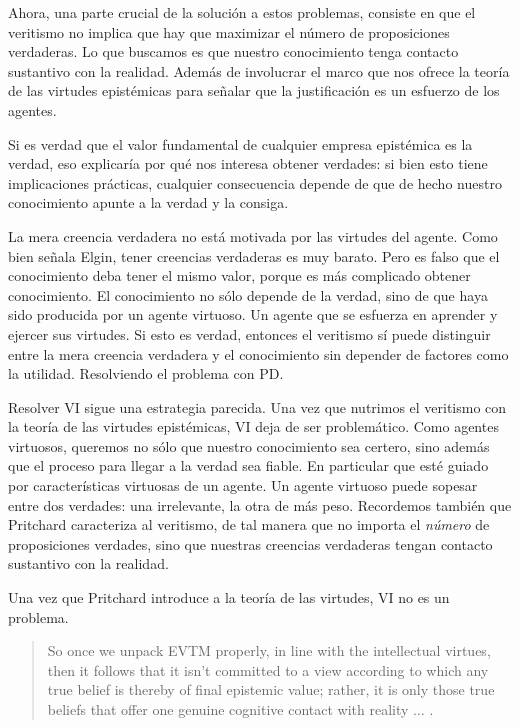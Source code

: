 Ahora, una parte crucial de la solución a estos problemas, consiste en que el veritismo no implica que hay que maximizar el número de proposiciones verdaderas.
Lo que buscamos es que nuestro conocimiento tenga contacto sustantivo con la realidad.
Además de involucrar el marco que nos ofrece la teoría de las virtudes epistémicas para señalar que la justificación es un esfuerzo de los agentes.

Si es verdad que el valor fundamental de cualquier empresa epistémica es la verdad, eso explicaría por qué nos interesa obtener verdades: si bien esto tiene implicaciones prácticas, cualquier consecuencia depende de que de hecho nuestro conocimiento apunte a la verdad y la consiga.

La mera creencia verdadera no está motivada por las virtudes del agente.
Como bien señala Elgin, tener creencias verdaderas es muy barato.
Pero es falso que el conocimiento deba tener el mismo valor, porque es más complicado obtener conocimiento.
El conocimiento no sólo depende de la verdad, sino de que haya sido producida por un agente virtuoso.
Un agente que se esfuerza en aprender y ejercer sus virtudes.
Si esto es verdad, entonces el veritismo sí puede distinguir entre la mera creencia verdadera y el conocimiento sin depender de factores como la utilidad.
Resolviendo el problema con PD.

Resolver VI sigue una estrategia parecida. 
Una vez que nutrimos el veritismo con la teoría de las virtudes epistémicas, VI deja de ser problemático.
Como agentes virtuosos, queremos no sólo que nuestro conocimiento sea certero, sino además que el proceso para llegar a la verdad sea fiable.
En particular que esté guiado por características virtuosas de un agente.
Un agente virtuoso puede sopesar entre dos verdades: una irrelevante, la otra de más peso.
Recordemos también que Pritchard caracteriza al veritismo, de tal manera que no importa el \emph{número} de proposiciones verdades, sino que nuestras creencias verdaderas tengan contacto sustantivo con la realidad.

Una vez que Pritchard introduce a la teoría de las virtudes, VI no es un problema. 

\begin{quote}
    So once we unpack EVTM properly, in line with the intellectual virtues, then it follows that it isn’t committed to a view according to which any true belief is thereby of final epistemic value; rather, it is only those true beliefs that offer one genuine cognitive contact with reality $\ldots$ \parencite[][p. 11]{pritchard2021}. 
\end{quote}

